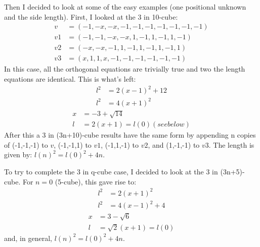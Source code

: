 \documentclass[superscriptaddress,reprint,amsmath,amssymb,aps]{revtex4-1}
\begin{document}
Then I decided to look at some of the easy examples (one positional
unknown and the side length).  First, I looked at the 3 in 10-cube:
\begin{align*}
     v  & = (-1, -x, -x, -1, -1, -1, -1, -1, -1, -1) \\
     v1 & = (-1, -1, -x, -x,  1, -1,  1, -1,  1, -1) \\
     v2 & = (-x, -x, -1,  1, -1,  1, -1,  1, -1,  1) \\
     v3 & = ( x,  1,  1,  x, -1, -1, -1, -1, -1, -1)
\end{align*}
In this case, all the orthogonal equations are trivially true and two
the length equations are identical.  This is what's left:
\begin{align*}
     l^2 & = 2(x-1)^2 + 12 \\
     l^2 & = 4(x+1)^2
\end{align*}
\begin{align*}
     x & = -3 + \sqrt{14}            \\
     l & = 2(x+1) = l(0) (see below)
\end{align*}
After this a 3 in (3n+10)-cube results have the same form by appending n
copies of (-1,-1,-1) to $v$, (-1,-1,1) to $v1$, (-1,1,-1) to $v2$, and
(1,-1,-1) to $v3$.  The length is given by:  $l(n)^2 = l(0)^2 + 4n$.

To try to complete the 3 in q-cube case, I decided to look at the 3 in
(3n+5)-cube.  For $n=0$ (5-cube), this gave rise to:
\begin{align*}
     l^2 & = 2(x+1)^2     \\
     l^2 & = 4(x-1)^2 + 4
\end{align*}
\begin{align*}
     x & = 3 - \sqrt{6}         \\
     l & = \sqrt{2}(x+1) = l(0)
\end{align*}
and, in general, $l(n)^2 = l(0)^2 + 4n$.
\end{document}
